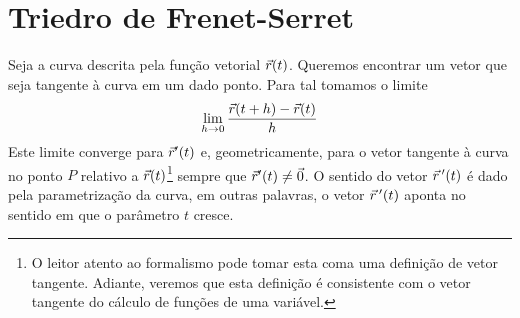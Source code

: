 \section{Triedro de Frenet-Serret}

Seja a curva descrita pela função vetorial $\vec{r}(t)$. Queremos encontrar um vetor que seja tangente à curva em um dado ponto. Para tal tomamos o limite
$$\lim_{h\to 0} \frac{\vec{r}(t+h)-\vec{r}(t)}{h}$$  
Este limite converge para $\vec{r}'(t)$ e, geometricamente, para o vetor tangente à curva no ponto $P$ relativo a $\vec{r}(t)$\footnote{O leitor atento ao formalismo pode tomar esta coma uma definição de vetor tangente. Adiante, veremos que esta definição é consistente com o vetor tangente do cálculo de funções de uma variável.} sempre que $\vec{r}'(t)\neq \vec{0}$. O sentido do vetor $\vec{r}~\!'(t)$ é dado pela parametrização da curva, em outras palavras, o vetor $\vec{r}~\!'(t)$ aponta no sentido em que o parâmetro $t$ cresce.
% 
%   
% 
% 
% 
% 
% 
%  
% 
% 

